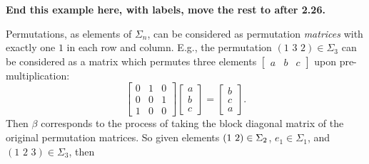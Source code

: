 \begin{example}
 \textbf{End this example here, with labels, move the rest to after 2.26.}

\begin{remark}\label{Rem:perm_matrices}
Permutations, as elements of $\Sigma_n$, can be considered as permutation \emph{matrices} with exactly one $1$ in each row and column. E.g., the permutation $(1 \,\, 3 \,\, 2) \in \Sigma_3$ can be considered as a matrix which permutes three elements $\begin{bmatrix} a & b & c \end{bmatrix}$ upon pre-multiplication:
  \[
  \begin{bmatrix}
  0 & 1 & 0 \\
  0 & 0 & 1 \\
  1 & 0 & 0
  \end{bmatrix}
  \begin{bmatrix}
  a \\ b \\ c
  \end{bmatrix}
  =
  \begin{bmatrix}
  b \\ c \\ a
  \end{bmatrix}.
  \]
Then $\beta$ corresponds to the process of taking the block diagonal matrix of the original permutation matrices. So given elements $( 1 \, \, 2 ) \in \Sigma_2$, $e_1 \in \Sigma_1$, and $(1 \,\, 2 \,\, 3) \in \Sigma_3$, then

\end{remark}
\end{example}
